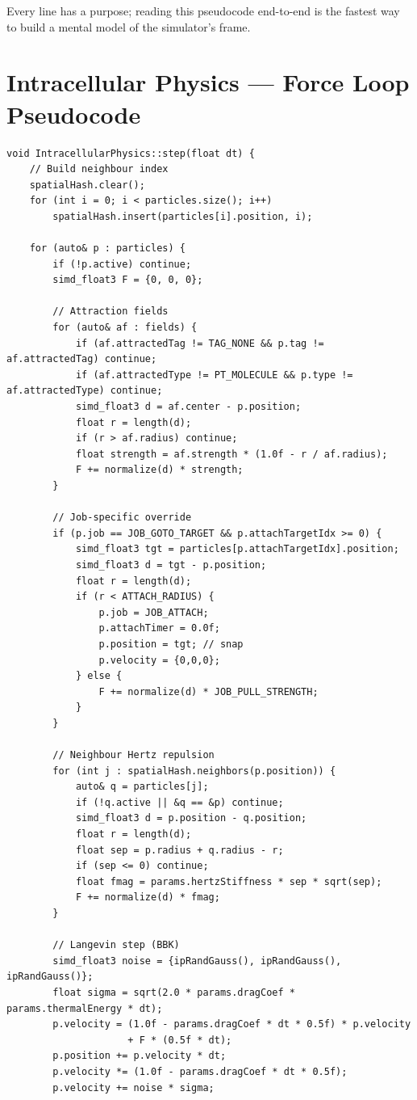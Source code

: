\documentclass[11pt,letterpaper,twoside,openany]{book}
\begin{document}
Every line has a purpose; reading this pseudocode end-to-end is
the fastest way to build a mental model of the simulator's frame.

\chapter{Intracellular Physics --- Force Loop Pseudocode}
\label{ch:intraphys-pseudo}

\begin{lstlisting}[language={[ISO]C++}]
void IntracellularPhysics::step(float dt) {
    // Build neighbour index
    spatialHash.clear();
    for (int i = 0; i < particles.size(); i++)
        spatialHash.insert(particles[i].position, i);

    for (auto& p : particles) {
        if (!p.active) continue;
        simd_float3 F = {0, 0, 0};

        // Attraction fields
        for (auto& af : fields) {
            if (af.attractedTag != TAG_NONE && p.tag != af.attractedTag) continue;
            if (af.attractedType != PT_MOLECULE && p.type != af.attractedType) continue;
            simd_float3 d = af.center - p.position;
            float r = length(d);
            if (r > af.radius) continue;
            float strength = af.strength * (1.0f - r / af.radius);
            F += normalize(d) * strength;
        }

        // Job-specific override
        if (p.job == JOB_GOTO_TARGET && p.attachTargetIdx >= 0) {
            simd_float3 tgt = particles[p.attachTargetIdx].position;
            simd_float3 d = tgt - p.position;
            float r = length(d);
            if (r < ATTACH_RADIUS) {
                p.job = JOB_ATTACH;
                p.attachTimer = 0.0f;
                p.position = tgt; // snap
                p.velocity = {0,0,0};
            } else {
                F += normalize(d) * JOB_PULL_STRENGTH;
            }
        }

        // Neighbour Hertz repulsion
        for (int j : spatialHash.neighbors(p.position)) {
            auto& q = particles[j];
            if (!q.active || &q == &p) continue;
            simd_float3 d = p.position - q.position;
            float r = length(d);
            float sep = p.radius + q.radius - r;
            if (sep <= 0) continue;
            float fmag = params.hertzStiffness * sep * sqrt(sep);
            F += normalize(d) * fmag;
        }

        // Langevin step (BBK)
        simd_float3 noise = {ipRandGauss(), ipRandGauss(), ipRandGauss()};
        float sigma = sqrt(2.0 * params.dragCoef * params.thermalEnergy * dt);
        p.velocity = (1.0f - params.dragCoef * dt * 0.5f) * p.velocity
                     + F * (0.5f * dt);
        p.position += p.velocity * dt;
        p.velocity *= (1.0f - params.dragCoef * dt * 0.5f);
        p.velocity += noise * sigma;


\end{lstlisting}
\end{document}
